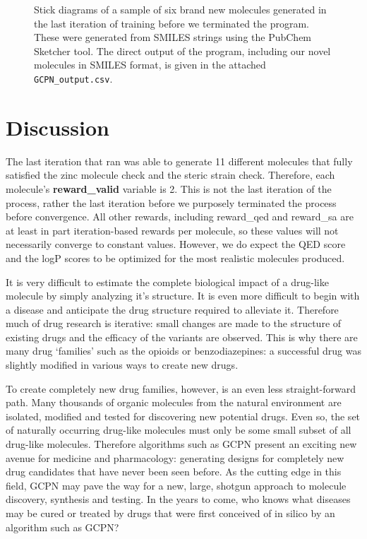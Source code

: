 \documentclass{article}
\begin{document}
\begin{figure}
\begin{subfigure}{0.3\textwidth}
    \end{subfigure}
    \caption{Stick diagrams of a sample of six brand new molecules generated in the last iteration of training before we terminated the program. These were generated from SMILES strings using the PubChem Sketcher tool. The direct output of the program, including our novel molecules in SMILES format, is given in the attached \texttt{GCPN\_output.csv}.}
    \label{fig:molecules}
\end{figure}





\section{Discussion}
The last iteration that ran was able to generate 11 different molecules that fully satisfied the zinc molecule check and the steric strain check. Therefore, each molecule’s \textbf{reward\_valid} variable is 2. This is not the last iteration of the process, rather the last iteration before we purposely terminated the process before convergence. All other rewards, including reward\_qed and reward\_sa are at least in part iteration-based rewards per molecule, so these values will not necessarily converge to constant values. However, we do expect the QED score and the logP scores to be optimized for the most realistic molecules produced.

It is very difficult to estimate the complete biological impact of a drug-like molecule by simply analyzing it's structure. It is even more difficult to begin with a disease and anticipate the drug structure required to alleviate it. Therefore much of drug research is iterative: small changes are made to the structure of existing drugs and the efficacy of the variants are observed. This is why there are many drug `families' such as the opioids or benzodiazepines: a successful drug was slightly modified in various ways to create new drugs.

To create completely new drug families, however, is an even less straight-forward path. Many thousands of organic molecules from the natural environment are isolated, modified and tested for discovering new potential drugs. Even so, the set of naturally occurring drug-like molecules must only be some small subset of all drug-like molecules. Therefore algorithms such as GCPN present an exciting new avenue for medicine and pharmacology: generating designs for completely new drug candidates that have never been seen before. As the cutting edge in this field, GCPN may pave the way for a new, large, shotgun approach to molecule discovery, synthesis and testing. In the years to come, who knows what diseases may be cured or treated by drugs that were first conceived of in silico by an algorithm such as GCPN?

\newpage


\end{document}
